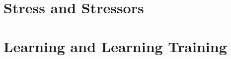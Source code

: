 \documentclass[makeidx]{book}
\begin{document}
\doparttoc
\frontmatter



% 


\mainmatter
\part{Stress and Stressors}
\parttoc


\part{Learning and Learning Training}

\parttoc




% 




{}

\backmatter
\printindex
\end{document}
